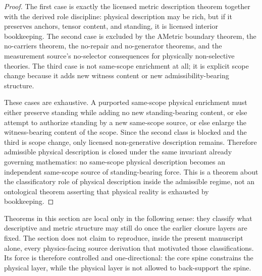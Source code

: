 \begin{proof}
The first case is exactly the licensed metric description theorem together with the derived role discipline: physical description may be rich, but if it preserves anchors, tensor content, and standing, it is licensed interior bookkeeping. The second case is excluded by the AMetric boundary theorem, the no-carriers theorem, the no-repair and no-generator theorems, and the measurement source's no-selector consequences for physically non-selective theories. The third case is not same-scope enrichment at all; it is explicit scope change because it adds new witness content or new admissibility-bearing structure.

These cases are exhaustive. A purported same-scope physical enrichment must either preserve standing while adding no new standing-bearing content, or else attempt to authorize standing by a new same-scope source, or else enlarge the witness-bearing content of the scope. Since the second class is blocked and the third is scope change, only licensed non-generative description remains. Therefore admissible physical description is closed under the same invariant already governing mathematics: no same-scope physical description becomes an independent same-scope source of standing-bearing force. This is a theorem about the classificatory role of physical description inside the admissible regime, not an ontological theorem asserting that physical reality is exhausted by bookkeeping.
\end{proof}



\begin{remark}
Theorems in this section are local only in the following sense: they classify what descriptive and metric structure may still do once the earlier closure layers are fixed. The section does not claim to reproduce, inside the present manuscript alone, every physics-facing source derivation that motivated those classifications. Its force is therefore controlled and one-directional: the core spine constrains the physical layer, while the physical layer is not allowed to back-support the spine.
\end{remark}


